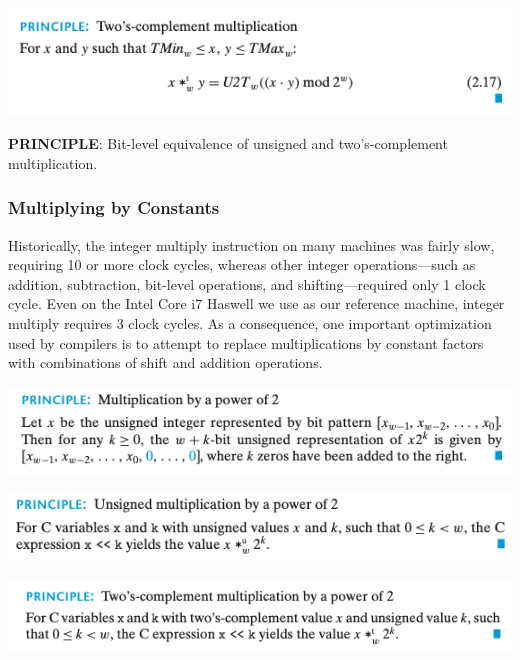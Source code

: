 \documentclass[11pt]{article}
\begin{document}
\begin{center}
\includegraphics[width=.9\linewidth]{pics/two's-complement-multiplication.png}
\end{center}

\textbf{PRINCIPLE}: Bit-level equivalence of unsigned and two's-complement multiplication.\\


\subsubsection{Multiplying by Constants}
\label{sec:orgadfee26}

Historically, the integer multiply instruction on many machines was fairly slow, requiring 10 or more clock cycles, whereas other integer operations—such as addition, subtraction, bit-level operations, and shifting—required only 1 clock cycle. Even on the Intel Core i7 Haswell we use as our reference machine, integer multiply requires 3 clock cycles. As a consequence, one important optimization used by compilers is to attempt to replace multiplications by constant factors with combinations of shift and addition operations.\\

\begin{center}
\includegraphics[width=.9\linewidth]{pics/multiplication-by-a-power-of-2.png}
\end{center}

\begin{center}
\includegraphics[width=.9\linewidth]{pics/unsigned-multiplication-by-a-power-of-2.png}
\end{center}

\begin{center}
\includegraphics[width=.9\linewidth]{pics/two's-complement-multiplication-by-a-power-of-2.png}
\end{center}
\end{document}
